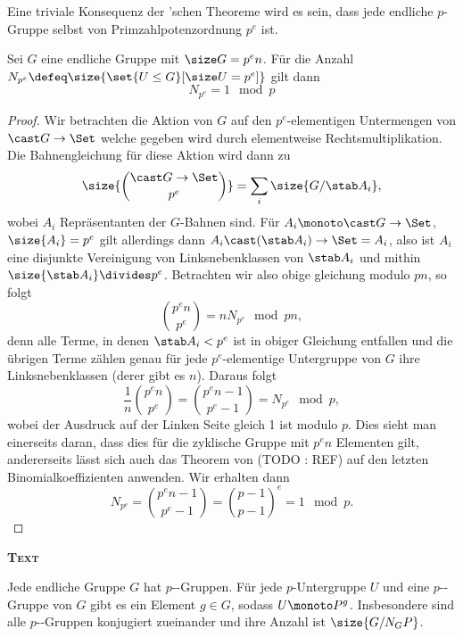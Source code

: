 \begin{remark}
    Eine triviale Konsequenz der 'schen Theoreme wird es sein, dass jede endliche $p$-Gruppe selbst von
    Primzahlpotenzordnung $p^e$ ist.
\end{remark}
%
\begin{theorem}
    Sei $G$ eine endliche Gruppe mit $\size G = p^e n$. Für die Anzahl $N_{p^e}\defeq \size{\set{U\leq G}[\size U=p^e]}$ gilt dann
    $$
    N_{p^e} = 1 \mod p
    $$
\end{theorem}
%
\begin{proof}
    Wir betrachten die Aktion von $G$ auf den $p^e$-elementigen Untermengen von $\cast G \to \Set$ welche gegeben wird durch
    elementweise Rechtsmultiplikation. Die Bahnengleichung für diese Aktion wird dann zu
    $$
    \size {\binom {\cast G \to \Set} {p^e}} = \sum_i {\size {G/\stab A_i}},
    $$
    wobei $A_i$ Repräsentanten der $G$-Bahnen sind.
    Für $A_i\monoto \cast G \to \Set$, $\size {A_i}=p^e$ gilt allerdings dann $A_i \cast (\stab A_i) \to \Set=A_i$, also ist $A_i$ eine disjunkte
    Vereinigung von Linksnebenklassen von $\stab A_i$ und mithin $\size {\stab A_i}\divides p^e$. Betrachten wir also obige
    gleichung modulo $pn$, so folgt
    $$
    \binom {p^e n}{p^e} = n N_{p^e} \mod pn, 
    $$
    denn alle Terme, in denen $\stab A_i<p^e$ ist in obiger Gleichung entfallen und die übrigen Terme zählen genau für jede
    $p^e$-elementige Untergruppe von $G$ ihre Linksnebenklassen (derer gibt es $n$).
    Daraus folgt
    $$
    \frac 1 n \binom {p^e n}{p^e} = \binom {p^e n-1} {p^e-1} = N_{p^e} \mod p,
    $$
    wobei der Ausdruck auf der Linken Seite gleich 1 ist modulo $p$. Dies sieht man einerseits daran, dass dies für die zyklische
    Gruppe mit $p^e n$ Elementen gilt, andererseits lässt sich auch das Theorem von  (TODO : REF) auf den letzten
    Binomialkoeffizienten anwenden. Wir erhalten dann
    $$
    N_{p^e} = \binom {p^e n - 1} {p^e -1} = {\binom {p-1} {p-1}}^e = 1 \mod p.
    $$
\end{proof}

{\bfseries\scshape Text}

\begin{theorem}
    Jede endliche Gruppe $G$ hat $p$--Gruppen. Für jede $p$-Untergruppe $U$ und eine $p$--Gruppe von
    $G$ gibt es ein Element $g\in G$, sodass $U\monoto P^g$. Insbesondere sind alle $p$--Gruppen konjugiert zueinander
    und ihre Anzahl ist $\size {G/N_G P}$. 
\end{theorem}

